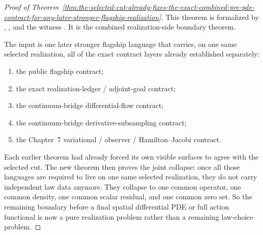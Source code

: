 \begin{proof}[Proof of Theorem~\ref{thm:the-selected-cut-already-fixes-the-exact-combined-pre-pde-contract-for-any-later-stronger-flagship-realization}]
\label{proof:thm:the-selected-cut-already-fixes-the-exact-combined-pre-pde-contract-for-any-later-stronger-flagship-realization}
This theorem is formalized by
,
, and the
witness
.
It is the combined realization-side boundary theorem.

The input is one later stronger flagship language that carries, on one same
selected realization, all of the exact contract layers already established
separately:
\begin{enumerate}
\item the public flagship contract;
\item the exact realization-ledger / adjoint-goal contract;
\item the continuum-bridge differential-flow contract;
\item the continuum-bridge derivative-subsampling contract;
\item the Chapter~7 variational / observer / Hamilton--Jacobi contract.
\end{enumerate}
Each earlier theorem had already forced its own visible surfaces to agree with
the selected cut. The new theorem then proves the joint collapse: once all
those languages are required to live on one same selected realization, they do
not carry independent law data anymore. They collapse to one common operator,
one common density, one common scalar residual, and one common zero set. So
the remaining boundary before a final spatial differential PDE or full action
functional is now a pure realization problem rather than a remaining law-choice
problem.
\end{proof}

